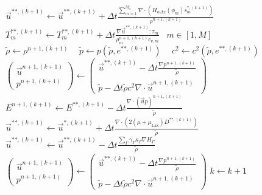 \documentclass[]{article}
\begin{document}
\begin{algorithm}
\begin{algorithmic}[1]
 \State $\vec{u}^{\ast\ast,(k+1)}\gets\vec{u}^{\ast\ast,(k+1)}+\Delta t\frac{\sum_{m=1}^{M_{e}}\nabla\cdot (H_{\alpha\Delta x}(\phi_{m}) s_{m}^{\ast,(k+1)})}{\rho^{n+1,(k+1)}}$
 \State $T_{m}^{\ast\ast,(k+1)}\gets T_{m}^{\ast\ast,(k+1)}+\Delta t\frac{\nabla\vec{u}^{\ast\ast,(k+1)}:\tau_{m}}{\rho_{m}^{n+1,(k+1)}c_{v,m}} \hspace{10pt} m\in[1,M]$ 
 \State $\tilde{\rho}\gets \rho^{n+1,(k+1)} \hspace{15pt} \tilde{p}\gets p(\tilde{\rho},e^{\ast\ast,(k+1)})  \hspace{15pt} c^{2}\gets c^{2}(\tilde{\rho},e^{\ast\ast,(k+1)})$
 \State $\left( \begin{array}{c} \vec{u}^{n+1,(k+1)} \\ 
           p^{n+1,(k+1)} \end{array}\right)\gets
  \left( \begin{array}{c} 
    \vec{u}^{\ast\ast,(k+1)}-\Delta t\frac{\nabla p^{n+1,(k+1)}}{\tilde{\rho}} \\
  \tilde{p}-\Delta t \tilde{\rho} c^{2} \nabla\cdot\vec{u}^{n+1,(k+1)}\end{array}\right)$
\State $E^{n+1,(k+1)}\gets E^{\ast\ast,(k+1)}-
	\Delta t\frac{\nabla\cdot(\vec{u}p)^{n+1,(k+1)}}{\tilde{\rho}}$
 \State $\vec{u}^{\ast\ast,(k+1)}\gets\vec{u}^{\ast,(k+1)}+\Delta t \frac{\nabla\cdot (2(\mu+\mu_{\mbox{Lax}})D^{\ast\ast,(k+1)})}{\tilde{\rho}}$ 
 \State $\vec{u}^{\ast\ast,(k+1)}\gets\vec{u}^{\ast\ast,(k+1)}-\Delta t\frac{\sum_{\Gamma}\gamma_{\Gamma}\kappa_{\Gamma}\nabla H_{\Gamma}}{\tilde{\rho}}$
 \State $\left( \begin{array}{c} \vec{u}^{n+1,(k+1)} \\ 
           p^{n+1,(k+1)} \end{array}\right)\gets
  \left( \begin{array}{c} 
    \vec{u}^{\ast\ast,(k+1)}-\Delta t\frac{\nabla p^{n+1,(k+1)}}{\tilde{\rho}} \\
  \tilde{p}-\Delta t \tilde{\rho} c^{2}\nabla\cdot\vec{u}^{n+1,(k+1)}\end{array}\right)$ 
 \State $k \gets k+1$
\EndWhile
\end{algorithmic}
\end{algorithm}
\end{document}
